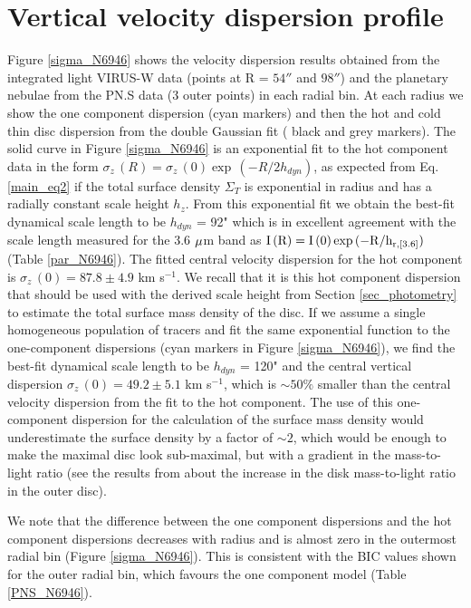 \documentclass[fleqn,usenatbib]{mnras}
\newcommand{\kms}{km s$^{-1}$}
\begin{document}
\section{Vertical velocity dispersion profile} %
\label{sec_dispersion}
Figure \ref{sigma_N6946} shows the %
velocity dispersion results obtained from the integrated light VIRUS-W data (points at R = $54''$ and $98''$) and the planetary nebulae from the PN.S data (3 outer points) in each radial bin. At each radius we show %
the one component dispersion %
(cyan markers) and then the hot and cold thin disc dispersion from the double Gaussian fit (%
black and grey markers). 
The solid curve in Figure \ref{sigma_N6946} is an exponential fit to the hot component data in the form $\sigma_z\,(R) = \sigma_z\,(0)  \exp \,(-R/2h_{dyn})$, as expected from Eq. \ref{main_eq2} if the total surface density $\Sigma_T$ is exponential in radius and has a radially constant scale height $h_z$.  From this exponential fit we obtain the best-fit dynamical scale length to be $h_{dyn}$ = 92" which is in excellent agreement with the scale length measured for the 3.6 $\rm \mu$m band as $\rm I\,(R) =  I\,(0) \exp \,(-R/h_{r,[3.6]})$ (Table \ref{par_N6946}). 
The fitted central velocity dispersion for the hot component is $\sigma_z\,(0) = 87.8 \pm 4.9 $ \kms. We recall that it is this hot component dispersion that should be used with the derived scale height from Section \ref{sec_photometry} to estimate the total surface mass density of the disc. If we assume a single homogeneous population of tracers and fit the same exponential function to the one-component dispersions (cyan markers in Figure \ref{sigma_N6946}), we find the best-fit dynamical scale length to be $h_{dyn}$ = 120" and the central vertical dispersion $\sigma_z\,(0)=49.2 \pm 5.1$ \kms , which is $\sim 50 \%$ smaller than the central velocity dispersion from the fit to the hot component. The use of this one-component dispersion for the calculation of the surface mass density would underestimate the surface density by a factor of $\sim 2$, which would be enough to make the maximal disc look sub-maximal, but with a gradient in the mass-to-light ratio (see the results from \citet{HC3} about the increase in the disk mass-to-light ratio in the outer disc).

We note that the difference between the one component dispersions and the hot component dispersions decreases with radius and is almost zero in the outermost radial bin (Figure \ref{sigma_N6946}). This is consistent with the BIC values shown for the outer radial bin, which favours the one component model (Table \ref{PNS_N6946}).
\end{document}
